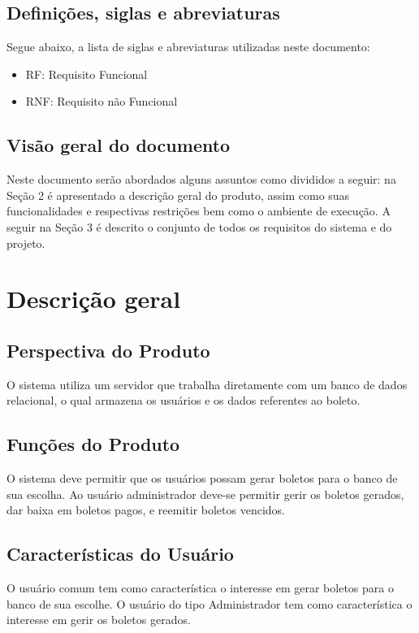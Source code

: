 \documentclass[12pt,a4paper,onecolumn,titlepage]{article}
\begin{document}
\subsection{Definições, siglas e abreviaturas}

Segue abaixo, a lista de siglas e abreviaturas utilizadas neste documento:
\begin{itemize}
\item RF: Requisito Funcional
\item RNF: Requisito não Funcional
\end{itemize}

\subsection{Visão geral do documento}

Neste documento serão abordados alguns assuntos como divididos a seguir:
na Seção 2 é apresentado a descrição geral do produto, assim como suas
funcionalidades e respectivas restrições bem como o ambiente de execução.
A seguir na Seção 3 é descrito o conjunto de todos os requisitos do sistema
e do projeto.

\section{Descrição geral}
\label{sect:descricao}

\subsection{Perspectiva do Produto}

O sistema utiliza um servidor que trabalha diretamente com um banco de dados relacional, o qual armazena os usuários e os dados referentes ao boleto.


\subsection{Funções do Produto}
O sistema deve permitir que os usuários possam gerar boletos para o banco de sua escolha. Ao usuário administrador deve-se permitir gerir os boletos gerados, dar baixa em boletos pagos, e reemitir boletos vencidos.

\subsection{Características do Usuário}

O usuário comum tem como característica o interesse em gerar boletos para o banco de sua escolhe. O usuário do tipo Administrador tem como característica o interesse em gerir os boletos gerados. 
\end{document}
